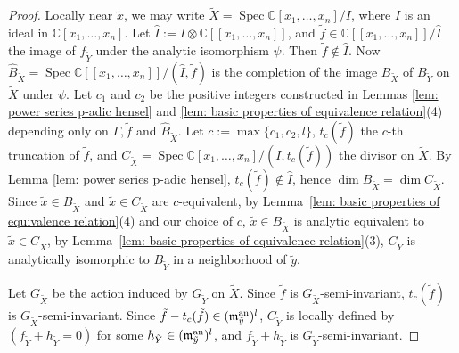 \documentclass[11pt]{amsart}
\numberwithin{equation}{section}
\newcommand{\Cc}{\mathbb{C}}
\newcommand{\fm}{\mathfrak{m}}
\newcommand{\Spec}{\operatorname{Spec}}
\newcommand{\Ii}{{\Gamma}}
\theoremstyle{definition}
\theoremstyle{definition}
\begin{document}
\begin{proof}
Locally near $\tilde{x}$, we may write $\tilde{X}=\Spec\Cc[x_1,\ldots,x_n]/I$, where $I$ is an ideal in $\Cc[x_1,\ldots,x_n]$. Let $\hat{I}:=I\otimes \Cc[[x_1,\ldots,x_n]]$, and $\tilde{f}\in \Cc[[x_1,\ldots,x_n]]/\hat{I}$ the image of $f_{\tilde{Y}}$ under the analytic isomorphism $\psi$. Then $\tilde{f}\notin \hat{I}$. Now $\hat{B}_{\tilde{X}}=\Spec\Cc[[x_1,\ldots,x_n]]/(\hat{I},\tilde{f})$ is the completion of the image $B_{\tilde{X}}$ of $B_{\tilde{Y}}$ on $\tilde{X}$ under $\psi$. Let $c_1$ and $c_2$ be the positive integers constructed in Lemmas \ref{lem: power series p-adic hensel} and \ref{lem: basic properties of equivalence relation}(4) depending only on $\Ii,\tilde{f}$ and $\hat{B}_{\tilde{X}}$. Let $c:=\max\{c_1,c_2,l\}$, $t_c(\tilde{f})$ the $c$-th truncation of $\tilde{f}$, and $C_{\tilde{X}}=\Spec\Cc[x_1,\ldots,x_n]/(I,t_c(\tilde{f}))$ the divisor on $\tilde{X}$. By Lemma \ref{lem: power series p-adic hensel}, $t_c(\tilde{f})\notin \hat{I}$, hence $\dim B_{\tilde{X}}=\dim C_{\tilde{X}}$. Since $\tilde{x}\in B_{\tilde{X}}$ and $\tilde{x}\in C_{\tilde{X}}$ are $c$-equivalent, by Lemma~\ref{lem: basic properties of equivalence relation}(4) and our choice of $c$, $\tilde{x}\in B_{\tilde{X}}$ is analytic equivalent to $\tilde{x}\in C_{\tilde{X}}$, by Lemma~\ref{lem: basic properties of equivalence relation}(3), $C_{\tilde{Y}}$ is analytically isomorphic to $B_{\tilde{Y}}$ in a neighborhood of $\tilde{y}$.

Let $G_{\tilde{X}}$ be the action induced by $G_{\tilde{Y}}$ on $\tilde{X}$. Since $\tilde{f}$ is $G_{\tilde{X}}$-semi-invariant, $t_c(\tilde{f})$ is $G_{\tilde{X}}$-semi-invariant. Since $\tilde{f}-t_c(\tilde{f})\in (\fm_{\tilde{y}}^{\rm an})^l$, $C_{\tilde{Y}}$ is locally defined by $(f_{\tilde{Y}}+h_{\tilde{Y}}=0)$ for some $h_{\tilde{Y}}\in (\fm_{\tilde{y}}^{\rm an})^l$, and $f_{\tilde{Y}}+h_{\tilde{Y}}$ is $G_{\tilde{Y}}$-semi-invariant. 
\end{proof}
\end{document}
